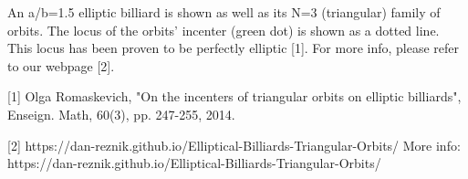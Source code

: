 An a/b=1.5 elliptic billiard is shown as well as its N=3 (triangular) family of orbits. The locus of the orbits' incenter (green dot) is shown as a dotted line. This locus has been proven to be perfectly elliptic [1]. For more info, please refer to our webpage [2].

[1] Olga Romaskevich, "On the incenters of triangular orbits on elliptic billiards", Enseign. Math,  60(3), pp. 247-255, 2014.

[2] https://dan-reznik.github.io/Elliptical-Billiards-Triangular-Orbits/
More info: https://dan-reznik.github.io/Elliptical-Billiards-Triangular-Orbits/